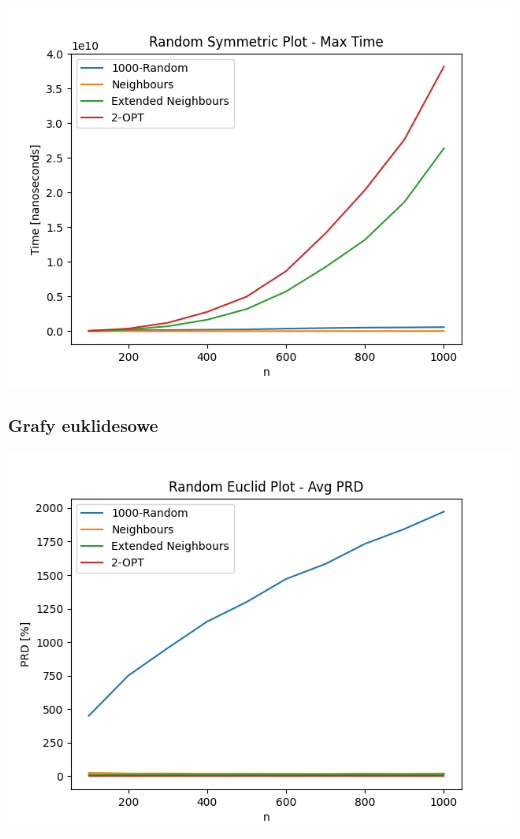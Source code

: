 \documentclass{article}
\begin{document}
\begin{center}
\includegraphics[width=\textwidth, 
                   height = 0.4\textheight, 
                   keepaspectratio]
                  {generated_sym_max_time} 
\end{center}

\subsubsection{Grafy euklidesowe}

\begin{center}
\includegraphics[width=\textwidth, 
                   height = 0.4\textheight, 
                   keepaspectratio]
                  {generated_euclid_avg_prd} 
\end{center}
\end{document}
